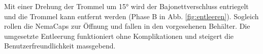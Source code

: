 Mit einer Drehung der Trommel um 15° wird der Bajonettverschluss entriegelt und die Trommel kann entfernt werden (Phase B in Abb. \ref{fig:entleeren}). Sogleich rollen die NemaCaps zur Öffnung und fallen in den vorgesehenen Behälter. Die umgesetzte Entleerung funktioniert ohne Komplikationen und steigert die Benutzerfreundlichkeit massgebend.